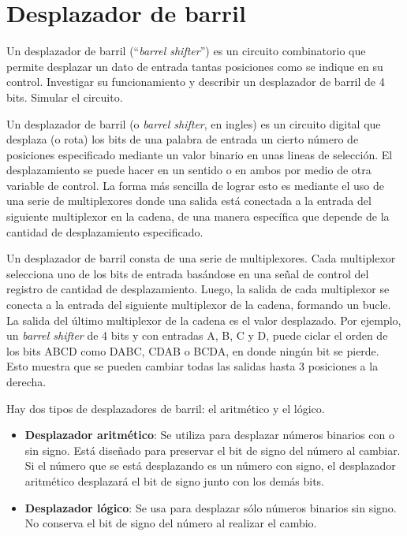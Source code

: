 \section{Desplazador de barril \label{sec:s1}}

\begin{center}
	\begin{minipage}{12cm}
		\begin{tcolorbox}[title=Actividad 1]
			Un desplazador de barril (“\textit{barrel shifter}”) es un circuito combinatorio que permite desplazar un dato de entrada tantas posiciones como se indique en su control. Investigar su funcionamiento y describir un desplazador de barril de 4 bits. Simular el circuito.
		\end{tcolorbox}	
	\end{minipage}
\end{center}

Un desplazador de barril (o \textit{barrel shifter}, en ingles) es un circuito digital que desplaza (o rota) los bits de una palabra de entrada un cierto número de posiciones especificado mediante un valor binario en unas lineas de selección. El desplazamiento se puede hacer en un sentido o en ambos por medio de otra variable de control. La forma más sencilla de lograr esto es mediante el uso de una serie de multiplexores donde una salida está conectada a la entrada del siguiente multiplexor en la cadena, de una manera específica que depende de la cantidad de desplazamiento especificado. \cite{Rouse_2017}

Un desplazador de barril consta de una serie de multiplexores. Cada multiplexor selecciona uno de los bits de entrada basándose en una señal de control del registro de cantidad de desplazamiento. Luego, la salida de cada multiplexor se conecta a la entrada del siguiente multiplexor de la cadena, formando un bucle. La salida del último multiplexor de la cadena es el valor desplazado.\cite{Mathur_2023} Por ejemplo, un \textit{barrel shifter} de 4 bits y con entradas A, B, C y D, puede ciclar el orden de los bits ABCD como DABC, CDAB o BCDA, en donde ningún bit se pierde. Esto muestra que se pueden cambiar todas las salidas hasta 3 posiciones a la derecha. \cite{Limones_2015}

Hay dos tipos de desplazadores de barril: el aritmético y el lógico.

\begin{itemize}
	\item \textbf{Desplazador aritmético}: Se utiliza para desplazar números binarios con o sin signo. Está diseñado para preservar el bit de signo del número al cambiar. Si el número que se está desplazando es un número con signo, el desplazador aritmético desplazará el bit de signo junto con los demás bits.
	\item \textbf{Desplazador lógico}: Se usa para desplazar sólo números binarios sin signo. No conserva el bit de signo del número al realizar el cambio.
\end{itemize}

